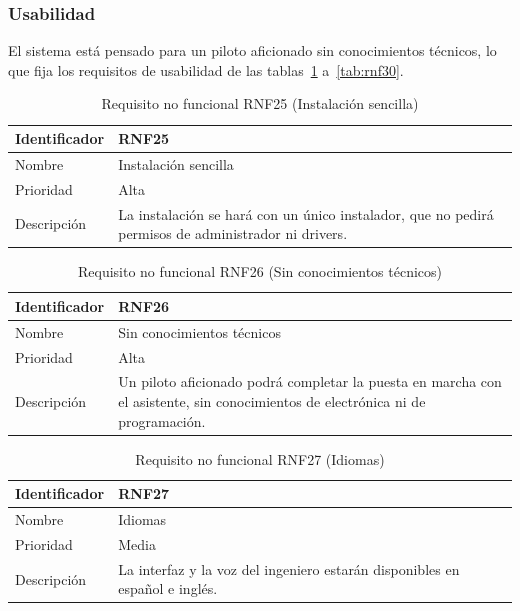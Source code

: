 \subsubsection{Usabilidad}

El sistema está pensado para un piloto aficionado sin conocimientos técnicos, lo que fija los requisitos de usabilidad de las tablas~\ref{tab:rnf25} a~\ref{tab:rnf30}.

\begin{table}[H]
	\centering
	\renewcommand{\arraystretch}{2}
	\begin{tabular}{|l|p{10cm}|}
		\hline
		Identificador & RNF25 \\
		\hline
		Nombre & Instalación sencilla \\
		\hline
		Prioridad & Alta \\
		\hline
		Descripción & La instalación se hará con un único instalador, que no pedirá permisos de administrador ni drivers. \\
		\hline
	\end{tabular}
	\caption{Requisito no funcional RNF25 (Instalación sencilla)}
	\label{tab:rnf25}
\end{table}

\begin{table}[H]
	\centering
	\renewcommand{\arraystretch}{2}
	\begin{tabular}{|l|p{10cm}|}
		\hline
		Identificador & RNF26 \\
		\hline
		Nombre & Sin conocimientos técnicos \\
		\hline
		Prioridad & Alta \\
		\hline
		Descripción & Un piloto aficionado podrá completar la puesta en marcha con el asistente, sin conocimientos de electrónica ni de programación. \\
		\hline
	\end{tabular}
	\caption{Requisito no funcional RNF26 (Sin conocimientos técnicos)}
	\label{tab:rnf26}
\end{table}

\begin{table}[H]
	\centering
	\renewcommand{\arraystretch}{2}
	\begin{tabular}{|l|p{10cm}|}
		\hline
		Identificador & RNF27 \\
		\hline
		Nombre & Idiomas \\
		\hline
		Prioridad & Media \\
		\hline
		Descripción & La interfaz y la voz del ingeniero estarán disponibles en español e inglés. \\
		\hline
	\end{tabular}
	\caption{Requisito no funcional RNF27 (Idiomas)}
	\label{tab:rnf27}
\end{table}

